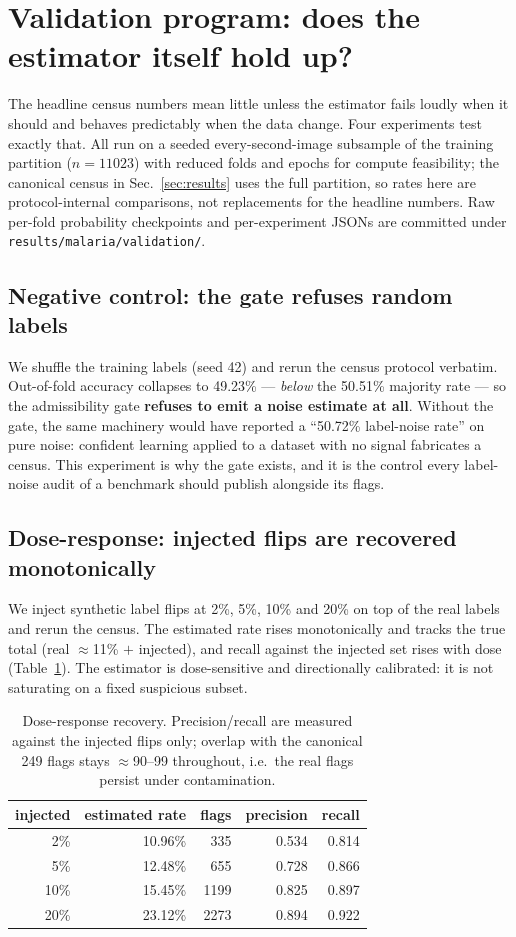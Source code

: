 
\section{Validation program: does the estimator itself hold up?}
\label{sec:validation}
The headline census numbers mean little unless the estimator fails loudly
when it should and behaves predictably when the data change. Four
experiments test exactly that. All run on a seeded every-second-image
subsample of the training partition ($n=11023$) with reduced folds and
epochs for compute feasibility; the canonical census in
Sec.~\ref{sec:results} uses the full partition, so rates here are
protocol-internal comparisons, not replacements for the headline numbers.
Raw per-fold probability checkpoints and per-experiment JSONs are committed
under \texttt{results/malaria/validation/}.

\subsection{Negative control: the gate refuses random labels}
We shuffle the training labels (seed 42) and rerun the census protocol
verbatim. Out-of-fold accuracy collapses to 49.23\%
--- \emph{below} the 50.51\% majority rate ---
so the admissibility gate \textbf{refuses to emit a noise estimate at
all}. Without the gate, the same machinery would have reported a
``50.72\% label-noise rate'' on pure
noise: confident learning applied to a dataset with no signal fabricates a
census. This experiment is why the gate exists, and it is the control every
label-noise audit of a benchmark should publish alongside its flags.

\subsection{Dose-response: injected flips are recovered monotonically}
We inject synthetic label flips at 2\%, 5\%, 10\% and 20\% on top of the
real labels and rerun the census. The estimated rate rises monotonically
and tracks the true total (real $\approx$11\% $+$ injected), and recall
against the injected set rises with dose (Table~\ref{tab:recovery}). The
estimator is dose-sensitive and directionally calibrated: it is not
saturating on a fixed suspicious subset.
\begin{table}[h]
\centering\small
\caption{Dose-response recovery. Precision/recall are measured against the
injected flips only; overlap with the canonical 249 flags stays
$\approx$90--99 throughout, i.e.\ the real flags persist under
contamination.}
\label{tab:recovery}
\begin{tabular}{r r r r r}
\hline
injected & estimated rate & flags & precision & recall \\ \hline
2\% & 10.96\% & 335 & 0.534 & 0.814 \\
5\% & 12.48\% & 655 & 0.728 & 0.866 \\
10\% & 15.45\% & 1199 & 0.825 & 0.897 \\
20\% & 23.12\% & 2273 & 0.894 & 0.922 \\
\hline
\end{tabular}
\end{table}


